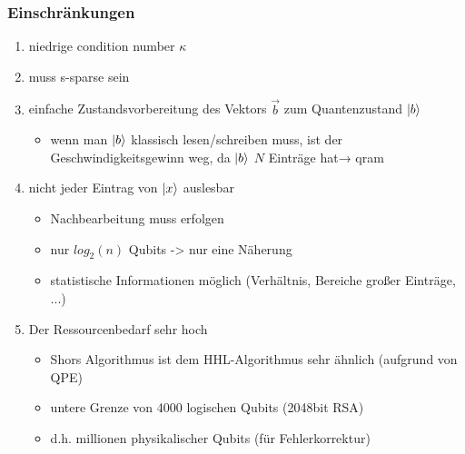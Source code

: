 \begin{frame}
    \frametitle{Einschränkungen}
    \begin{enumerate}
        \item niedrige condition number $\kappa$ 

        \item muss s-sparse sein

        \item einfache Zustandsvorbereitung des Vektors $\vec b$ zum Quantenzustand $\ket{b}$
            \begin{itemize}
                \item wenn man $\ket{b}$ klassisch lesen/schreiben muss, ist der Geschwindigkeitsgewinn weg, da $\ket{b}$ $N$ Einträge hat→ qram
            \end{itemize}
        \item nicht jeder Eintrag von $\ket{x}$ auslesbar
            \begin{itemize}
                \item Nachbearbeitung muss erfolgen
                \item nur $log_2(n)$ Qubits -> nur eine Näherung
                \item statistische Informationen möglich (Verhältnis, Bereiche großer Einträge, ...)
            \end{itemize}
 
        \item Der Ressourcenbedarf sehr hoch
            \begin{itemize}
                \item Shors Algorithmus ist dem HHL-Algorithmus sehr ähnlich (aufgrund von QPE)
                \item untere Grenze von 4000 logischen Qubits (2048bit RSA)
                \item d.h. millionen physikalischer Qubits (für Fehlerkorrektur)
            \end{itemize}
    \end{enumerate}

\end{frame}

